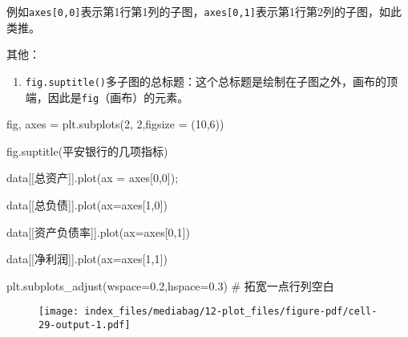 \documentclass[
  letterpaper,
  DIV=11,
  numbers=noendperiod]{scrreprt}
\newenvironment{Shaded}{\begin{snugshade}}{\end{snugshade}}
\newcommand{\CommentTok}[1]{\textcolor[rgb]{0.37,0.37,0.37}{#1}}
\newcommand{\DecValTok}[1]{\textcolor[rgb]{0.68,0.00,0.00}{#1}}
\newcommand{\FloatTok}[1]{\textcolor[rgb]{0.68,0.00,0.00}{#1}}
\newcommand{\NormalTok}[1]{\textcolor[rgb]{0.00,0.23,0.31}{#1}}
\newcommand{\OperatorTok}[1]{\textcolor[rgb]{0.37,0.37,0.37}{#1}}
\newcommand{\StringTok}[1]{\textcolor[rgb]{0.13,0.47,0.30}{#1}}
\providecommand{\tightlist}{%
  \setlength{\itemsep}{0pt}\setlength{\parskip}{0pt}}\usepackage{longtable,booktabs,array}
\begin{document}
例如\texttt{axes{[}0,0{]}}表示第1行第1列的子图，\texttt{axes{[}0,1{]}}表示第1行第2列的子图，如此类推。

其他：

\begin{enumerate}
\def\labelenumi{\arabic{enumi}.}
\tightlist
\item
  \texttt{fig.suptitle()}多子图的总标题：这个总标题是绘制在子图之外，画布的顶端，因此是\texttt{fig}（画布）的元素。
\end{enumerate}

\begin{Shaded}
\begin{Highlighting}[]
\NormalTok{fig, axes }\OperatorTok{=}\NormalTok{ plt.subplots(}\DecValTok{2}\NormalTok{, }\DecValTok{2}\NormalTok{,figsize }\OperatorTok{=}\NormalTok{ (}\DecValTok{10}\NormalTok{,}\DecValTok{6}\NormalTok{)) }

\NormalTok{fig.suptitle(}\StringTok{\textquotesingle{}平安银行的几项指标\textquotesingle{}}\NormalTok{)}

\NormalTok{data[[}\StringTok{\textquotesingle{}总资产\textquotesingle{}}\NormalTok{]].plot(ax }\OperatorTok{=}\NormalTok{ axes[}\DecValTok{0}\NormalTok{,}\DecValTok{0}\NormalTok{])}\OperatorTok{;}

\NormalTok{data[[}\StringTok{\textquotesingle{}总负债\textquotesingle{}}\NormalTok{]].plot(ax}\OperatorTok{=}\NormalTok{axes[}\DecValTok{1}\NormalTok{,}\DecValTok{0}\NormalTok{])}

\NormalTok{data[[}\StringTok{\textquotesingle{}资产负债率\textquotesingle{}}\NormalTok{]].plot(ax}\OperatorTok{=}\NormalTok{axes[}\DecValTok{0}\NormalTok{,}\DecValTok{1}\NormalTok{])}

\NormalTok{data[[}\StringTok{\textquotesingle{}净利润\textquotesingle{}}\NormalTok{]].plot(ax}\OperatorTok{=}\NormalTok{axes[}\DecValTok{1}\NormalTok{,}\DecValTok{1}\NormalTok{])}

\NormalTok{plt.subplots\_adjust(wspace}\OperatorTok{=}\FloatTok{0.2}\NormalTok{,hspace}\OperatorTok{=}\FloatTok{0.3}\NormalTok{) }\CommentTok{\# 拓宽一点行列空白}
\end{Highlighting}
\end{Shaded}

\begin{figure}[H]

{\centering \texttt{[image: index\_files/mediabag/12-plot\_files/figure-pdf/cell-29-output-1.pdf]}

}

\end{figure}
\end{document}
